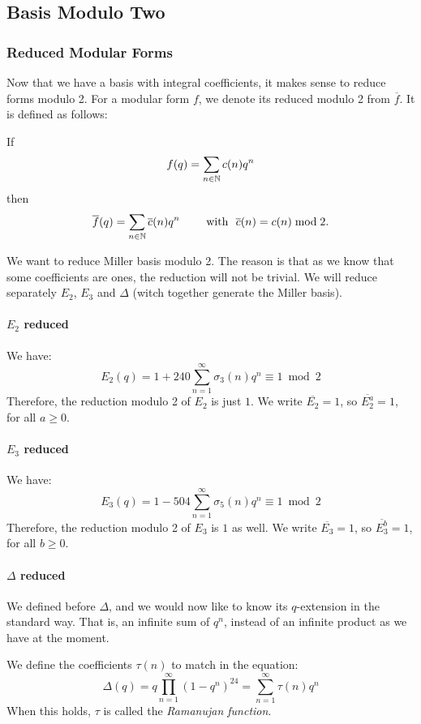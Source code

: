 \subsection{Basis Modulo Two}
\subsubsection{Reduced Modular Forms}
Now that we have a basis with integral coefficients, it makes sense to reduce forms modulo 2.
For a modular form $f$, we denote its reduced modulo 2 from $\overline{f}$. It is defined as follows:

If
$$
f(q) = \sum_{n \in \mathbb{N}} c(n)q^n
$$
then
$$
\overline{f}(q) = \sum_{n \in \mathbb{N}} \overline{c}(n)q^n 
\qquad \text{ with } \ \overline{c}(n) = c(n) \bmod 2 .
$$

We want to reduce Miller basis modulo 2.
The reason is that as we know that some coefficients are ones, the reduction will not be trivial.
We will reduce separately $E_2$, $E_3$ and $\Delta$ (witch together generate the Miller basis).

\paragraph{$E_2$ reduced}
We have:
$$
E_2(q) 
= 1 + 240 \sum_{n=1}^{\infty} \sigma_{3}(n)q^n
\equiv 1 \bmod 2
$$
Therefore, the reduction modulo 2 of $E_2$ is just $1$.
We write $\overline{E_2} = 1$, so $\overline{E_2^a} = 1$, for all $a \geq 0$.

\paragraph{$E_3$ reduced}
We have:
$$
E_3(q)
= 1 - 504 \sum_{n=1}^{\infty} \sigma_{5}(n)q^n
\equiv 1 \bmod 2
$$
Therefore, the reduction modulo 2 of $E_3$ is $1$ as well.
We write $\overline{E_3} = 1$, so $\overline{E_3^b} = 1$, for all $b \geq 0$.

\paragraph{$\Delta$ reduced}
We defined before $\Delta$, and we would now like to know its $q$-extension in the standard way.
That is, an infinite sum of $q^n$, instead of an infinite product as we have at the moment.

We define the coefficients $\tau(n)$ to match in the equation: 
$$
\Delta(q) 
= q \prod_{n=1}^{\infty} (1-q^n)^{24} 
= \sum_{n=1}^{\infty} \tau(n)q^n
$$
When this holds, $\tau$ is called the \textit{Ramanujan function}.

